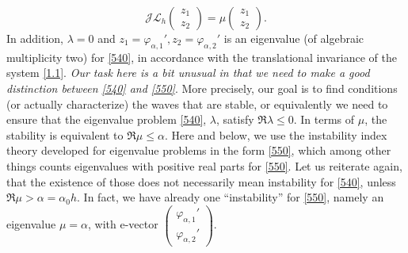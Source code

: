 \documentclass[12pt]{amsart}
\theoremstyle{definition}
\theoremstyle{remark}
\numberwithin{equation}{section}
\renewcommand{\(}{\left(}
\renewcommand{\)}{\right)}
\renewcommand{\[}{\left[}
\renewcommand{\]}{\right]}
\newcommand{\cl}{{\mathcal L}}
\newcommand{\al}{\alpha}
\newcommand{\la}{\lambda}
\newcommand{\vp}{\varphi}
\newcommand{\cj}{{\mathcal J}}
\begin{document}
 \begin{equation}
 \label{550}
 \cj \cl_h
 \left(\begin{array}{c}
 z_1 \\ z_2
 \end{array}
 \right) =   \mu   \left(\begin{array}{c}
 z_1 \\ z_2
 \end{array}
 \right).
 \end{equation}
 In addition, $\la=0$ and $z_1=\vp_{\al,1}', z_2=\vp_{\al,2}'$ is an eigenvalue (of algebraic multiplicity two) for \eqref{540}, in accordance with the translational invariance of the system \eqref{1.1}.
 {\it Our task here is a bit unusual in that we need to make a good distinction between \eqref{540} and \eqref{550}}.  More precisely, our goal is to find conditions (or actually characterize) the waves that are stable, or equivalently we need to ensure that the eigenvalue problem \eqref{540}, $\la$, satisfy $\Re \la\leq 0$.  In terms of $\mu$, the stability is equivalent to $\Re\mu\leq \al$.
 Here and below, we use the instability index theory developed for eigenvalue problems in the form \eqref{550}, which among other things counts eigenvalues with positive real parts for \eqref{550}. Let us reiterate again, that the existence of those does not necessarily mean instability for \eqref{540}, unless $\Re\mu>\al=\al_0 h$. In fact, we have already one ``instability'' for \eqref{550}, namely an eigenvalue $\mu=\al$, with e-vector $\left(\begin{array}{c} \vp_{\al,1}' \\ \vp_{\al,2}'\end{array} \right)$.
\end{document}
